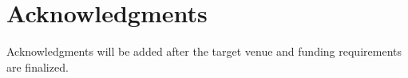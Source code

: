 \section*{Acknowledgments}

Acknowledgments will be added after the target venue and funding requirements are finalized.
